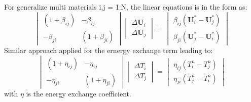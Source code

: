 \documentclass[preprint,12pt]{elsarticle}
\begin{document}
%
For generalize multi materials i,j = 1:N, the linear equations is in the form as:
%
%
\[ \begin{vmatrix} (1 + \beta_{ij})  &  -\beta_{ij} \\
                  -\beta_{ji}       &  (1 + \beta_{ji})
    \end {vmatrix}
    \begin{vmatrix} \Delta \pmb{U}_{i} \\
                    \Delta \pmb{U}_{j}
    \end {vmatrix}
    =
    \begin{vmatrix}  \beta_{ij}(\pmb{U}_{i}^{*} - \pmb{U}_{j}^{*}) \\
                    \beta_{ji}(\pmb{U}_{j}^{*} - \pmb{U}_i^{*})
    \end {vmatrix}                
\]
Similar approach applied for the ernergy exchange term leading to:
%
%
\[ \begin{vmatrix} (1 + \eta_{ij})  &  -\eta_{ij} \\
                  -\eta_{ji}       &  (1 + \eta_{ji})
    \end {vmatrix}
    \begin{vmatrix} \Delta T_{i} \\
                    \Delta T_{j}
    \end {vmatrix}
    =
    \begin{vmatrix}  \eta_{ij}(T_{i}^{n} - T_{j}^{n}) \\
                    \eta_{ji}(T_{j}^{n} - T_i^{n})
    \end {vmatrix}                
\]
with $\eta$ is the energy exchange coefficient.
%
%

%
%






\end{document}
